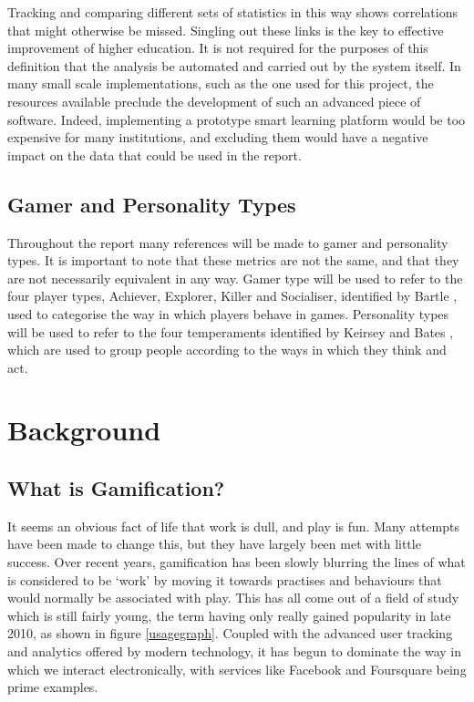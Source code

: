 \documentclass[12pt,a4paper,twoside]{report}
\begin{document}
Tracking and comparing different sets of statistics in this way shows correlations that might otherwise be missed. Singling out these links is the key to effective improvement of higher education. It is not required for the purposes of this definition that the analysis be automated and carried out by the system itself. In many small scale implementations, such as the one used for this project, the resources available preclude the development of such an advanced piece of software. Indeed, implementing a prototype smart learning platform would be too expensive for many institutions, and excluding them would have a negative impact on the data that could be used in the report.

\section{Gamer and Personality Types}
Throughout the report many references will be made to gamer and personality types. It is important to note that these metrics are not the same, and that they are not necessarily equivalent in any way. Gamer type will be used to refer to the four player types, Achiever, Explorer, Killer and Socialiser, identified by Bartle \cite{bartle1996hearts}, used to categorise the way in which players behave in games. Personality types will be used to refer to the four temperaments identified by Keirsey and Bates \cite{keirsey1984}, \cite{keirsey1998please} which are used to group people according to the ways in which they think and act.

\chapter{Background}
\section{What is Gamification?}
It seems an obvious fact of life that work is dull, and play is fun. Many attempts have been made to change this, but they have largely been met with little success. Over recent years, gamification has been slowly blurring the lines of what is considered to be `work' by moving it towards practises and behaviours that would normally be associated with play. This has all come out of a field of study which is still fairly young, the term having only really gained popularity in late 2010, as shown in figure \ref{usagegraph}. Coupled with the advanced user tracking and analytics offered by modern technology, it has begun to dominate the way in which we interact electronically, with services like Facebook and Foursquare being prime examples.
\end{document}
